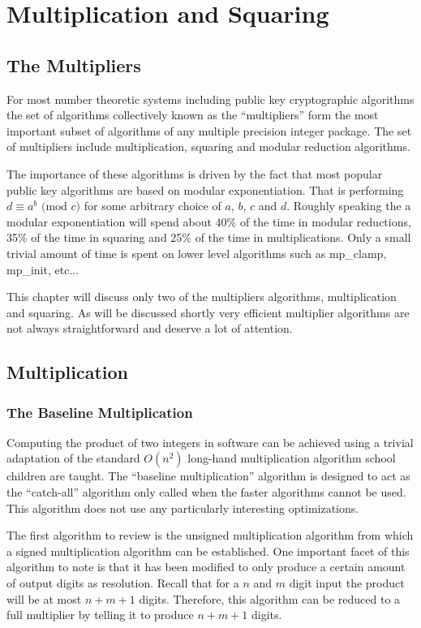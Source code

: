 \documentclass[b5paper]{book}
\begin{document}
\chapter{Multiplication and Squaring}
\section{The Multipliers}
For most number theoretic systems including public key cryptographic algorithms the set of algorithms collectively known as the
``multipliers'' form the most important subset of algorithms of any multiple precision integer package.  The set of multipliers 
include multiplication, squaring and modular reduction algorithms.  

The importance of these algorithms is driven by the fact that most popular public key algorithms are based on modular 
exponentiation.  That is performing $d \equiv a^b \mbox{ (mod }c\mbox{)}$ for some arbitrary choice of $a$, $b$, $c$ and $d$.  Roughly
speaking the a modular exponentiation will spend about 40\% of the time in modular reductions, 35\% of the time in squaring and 25\% of
the time in multiplications.  Only a small trivial amount of time is spent on lower level algorithms such as mp\_clamp, mp\_init, etc...

This chapter will discuss only two of the multipliers algorithms, multiplication and squaring.  As will be discussed shortly very efficient
multiplier algorithms are not always straightforward and deserve a lot of attention.

\section{Multiplication}
\subsection{The Baseline Multiplication}
Computing the product of two integers in software can be achieved using a trivial adaptation of the standard $O(n^2)$ long-hand multiplication
algorithm school children are taught.  The ``baseline multiplication'' algorithm is designed to act as the ``catch-all'' algorithm only called
when the faster algorithms cannot be used.  This algorithm does not use any particularly interesting optimizations.

The first algorithm to review is the unsigned multiplication algorithm from which a signed multiplication algorithm can be established.  One important 
facet of this algorithm to note is that it has been modified to only produce a certain amount of output digits as resolution.  Recall that for
a $n$ and $m$ digit input the product will be at most $n + m + 1$ digits.  Therefore, this algorithm can be reduced to a full multiplier by
telling it to produce $n + m + 1$ digits.  
\end{document}
